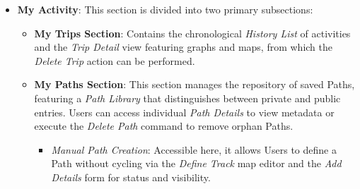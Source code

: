 \begin{itemize}
    \item \textbf{My Activity}:
    This section is divided into two primary subsections:
    \begin{itemize}
        \item \textbf{My Trips Section}: Contains the chronological \emph{History List} of activities and the \emph{Trip Detail} view featuring graphs and maps, from which the \emph{Delete Trip} action can be performed. 
        \item \textbf{My Paths Section}: This section manages the repository of saved Paths, featuring a \emph{Path Library} that distinguishes between private and public entries. Users can access individual \emph{Path Details} to view metadata or execute the \emph{Delete Path} command to remove orphan Paths. 
        \begin{itemize} 
            \item \emph{Manual Path Creation}: Accessible here, it allows Users to define a Path without cycling via the \emph{Define Track} map editor and the \emph{Add Details} form for status and visibility. 
        \end{itemize}
    \end{itemize}


\end{itemize}
